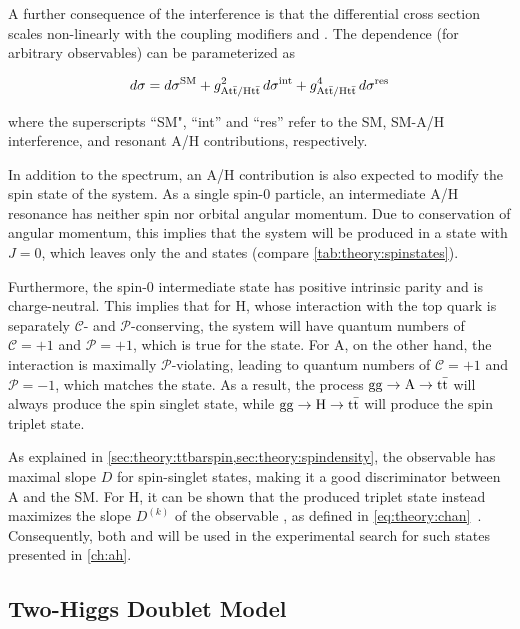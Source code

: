 A further consequence of the interference is that the differential cross section scales non-linearly with the coupling modifiers \gAtt and \gHtt. The dependence (for arbitrary observables) can be parameterized as 

\begin{equation}
\label{eq:theory:ahxs}
    d \sigma = d \sigma^{\mathrm{SM}} + g_{\mathrm{A t \bar{t} / H t \bar{t}}}^2 \, d \sigma^{\mathrm{int}} + g_{\mathrm{A t \bar{t} / H t \bar{t}}}^4 \, d \sigma^{\mathrm{res}}
\end{equation}

\noindent where the superscripts ``SM", ``int'' and ``res'' refer to the SM, SM-A/H interference, and resonant A/H contributions, respectively.

In addition to the \mtt spectrum, an A/H contribution is also expected to modify the spin state of the \ttbar system. As a single spin-0 particle, an intermediate A/H resonance has neither spin nor orbital angular momentum. Due to conservation of angular momentum, this implies that the \ttbar system will be produced in a state with $J = 0$, which leaves only the  and  states (compare \cref{tab:theory:spinstates}).

Furthermore, the spin-0 intermediate state has positive intrinsic parity and is charge-neutral. This implies that for H, whose interaction with the top quark is separately $\mathcal{C}$- and $\mathcal{P}$-conserving, the \ttbar system will have quantum numbers of $\mathcal{C} = +1$ and $\mathcal{P} = +1$, which is true for the  state. For A, on the other hand, the interaction is maximally $\mathcal{P}$-violating, leading to quantum numbers of $\mathcal{C} = +1$ and $\mathcal{P} = -1$, which matches the  state. As a result, the process $\mathrm{gg \rightarrow A \rightarrow \mathrm{t \bar{t}}}$ will always produce the  spin singlet state, while $\mathrm{gg \rightarrow H \rightarrow \mathrm{t \bar{t}}}$ will produce the  spin triplet state.

As explained in \cref{sec:theory:ttbarspin,sec:theory:spindensity}, the observable \chel has maximal slope $D$ for spin-singlet states, making it a good discriminator between A and the SM. For H, it can be shown that the produced triplet state instead maximizes the slope $D^{(k)}$ of the observable \chan, as defined in \cref{eq:theory:chan}~\cite{Maltoni:2024tul}. Consequently, both \chel and \chan will be used in the experimental search for such states presented in \cref{ch:ah}.

\subsection{Two-Higgs Doublet Model}
\label{sec:theory:twohdm}

